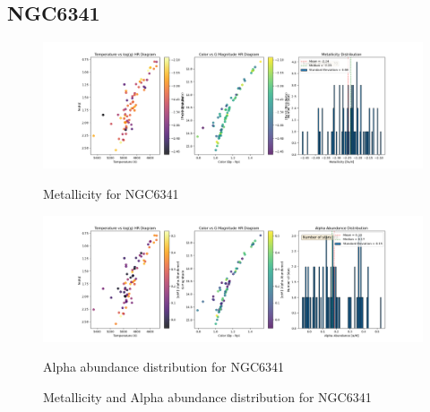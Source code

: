 \documentclass[a4paper,12pt]{article}
\begin{document}
\subsection{NGC6341}
\begin{figure}[H]
    \centering
    \begin{minipage}[b]{0.8\textwidth}
        \centering
        \includegraphics[width=\textwidth]{NGC6341_metalicity.png}
        \caption{Metallicity for NGC6341}
        \label{fig:NGC6341_metalicity}
    \end{minipage}
    \hfill
    \begin{minipage}[b]{0.8\textwidth}
        \centering
        \includegraphics[width=\textwidth]{NGC6341_alpha.png}
        \caption{Alpha abundance distribution for NGC6341}
        \label{fig:NGC6341_alpha}
    \end{minipage}
    \caption{Metallicity and Alpha abundance distribution for NGC6341}
    \label{fig:NGC6341_combined}
\end{figure}
\clearpage
\end{document}
